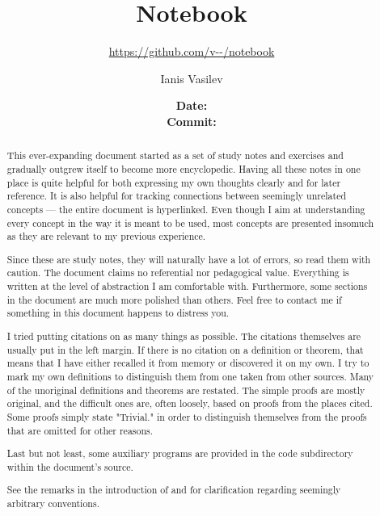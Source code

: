 \documentclass{classes/notebook}
\title{Notebook}
\subtitle{\url{https://github.com/v--/notebook}}
\author{Ianis Vasilev}
\date
  {
    \normalsize
    \textbf{Date:} \GitCommitInfoDate \\
    \textbf{Commit:} \texttt{\GitCommitInfoHash}
  }
\begin{document}
  \maketitle

  \begin{abstract}
    This ever-expanding document started as a set of study notes and exercises and gradually outgrew itself to become more encyclopedic. Having all these notes in one place is quite helpful for both expressing my own thoughts clearly and for later reference. It is also helpful for tracking connections between seemingly unrelated concepts --- the entire document is hyperlinked. Even though I aim at understanding every concept in the way it is meant to be used, most concepts are presented insomuch as they are relevant to my previous experience.

    Since these are study notes, they will naturally have a lot of errors, so read them with caution. The document claims no referential nor pedagogical value. Everything is written at the level of abstraction I am comfortable with. Furthermore, some sections in the document are much more polished than others. Feel free to contact me if something in this document happens to distress you.

    I tried putting citations on as many things as possible. The citations themselves are usually put in the left margin. If there is no citation on a definition or theorem, that means that I have either recalled it from memory or discovered it on my own. I try to mark my own definitions to distinguish them from one taken from other sources. Many of the unoriginal definitions and theorems are restated. The simple proofs are mostly original, and the difficult ones are, often loosely, based on proofs from the places cited. Some proofs simply state "Trivial." in order to distinguish themselves from the proofs that are omitted for other reasons.

    Last but not least, some auxiliary programs are provided in the code subdirectory within the document's source.

    See the remarks in the introduction of  and  for clarification regarding seemingly arbitrary conventions.
  \end{abstract}

  \newpage
  \tableofcontents
  \newpage

  
  
  
  
  
  
\end{document}
